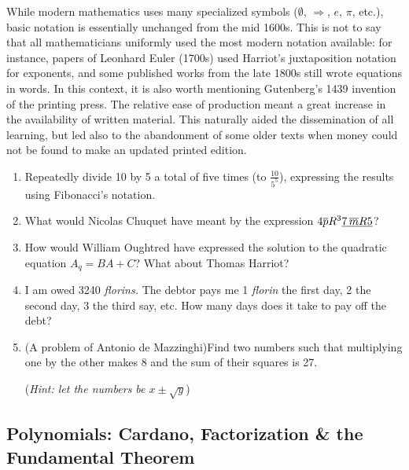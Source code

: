 While modern mathematics uses many specialized symbols ($\emptyset$, $\Rightarrow$, $e$, $\pi$, etc.), basic notation is essentially unchanged from the mid 1600s. This is not to say that all mathematicians uniformly used the most modern notation available: for instance, papers of Leonhard Euler (1700s) used Harriot's juxtaposition notation for exponents, and some published works from the late 1800s still wrote equations in words.\smallbreak
In this context, it is also worth mentioning Gutenberg's 1439 invention of the printing press. The relative ease of production meant a great increase in the availability of written material. This naturally aided the dissemination of all learning, but led also to the abandonment of some older texts when money could not be found to make an updated printed edition.


\begin{exercises}{}{}
	\hangindent{}
	\begin{enumerate}
	  \item Repeatedly divide 10 by 5 a total of five times (to $\frac{10}{5^5}$), expressing the results using Fibonacci's notation.
	  
	  \item What would Nicolas Chuquet have meant by the expression $4\overline{p}R^3\underline{7\,\overline{m}R5}$?
	  
	  \item How would William Oughtred have expressed the solution to the quadratic equation $A_q=BA+C$? What about Thomas Harriot?
	  
	  \item%
		I am owed 3240 \emph{florins.} The debtor pays me 1 \emph{florin} the first day, 2 the second day, 3 the third say, etc. How many days does it take to pay off the debt?
	  
	  
		\item%
		(A problem of Antonio de Mazzinghi)\lstsp Find two numbers such that multiplying one by the other makes 8 and the sum of their squares is 27.\par
		(\emph{Hint: let the numbers be $x\pm\sqrt y$})
	\end{enumerate}
\end{exercises}


\clearpage


\subsection{Polynomials: Cardano, Factorization \& the Fundamental Theorem}

